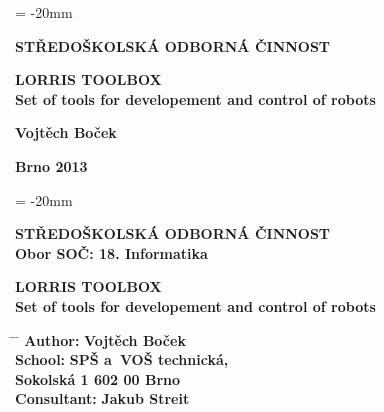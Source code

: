 \documentclass[12pt, a4paper, oneside]{article}
\newcommand{\B}{\textbf} %
\begin{document}

\pagestyle{empty} %
 
\voffset = -20mm %
\enlargethispage{60mm} %

\begin{center}
 
\Large \B{STŘEDOŠKOLSKÁ ODBORNÁ ČINNOST}

\vspace{60mm}

\huge %
\B{LORRIS TOOLBOX \\ Set of tools for developement and control of robots}

\Large

\vspace{90mm}


\B{Vojtěch Boček} \\

\vspace{40mm}

\B{Brno 2013}


\end{center}

\newpage %

\voffset = -20mm %
\enlargethispage{60mm} %

\begin{center}

\Large \B{STŘEDOŠKOLSKÁ ODBORNÁ ČINNOST}  \\
\vspace{10mm}
 \normalsize 
\B{Obor SOČ: 18. Informatika}%

\vspace{45mm}

\LARGE %
\B{LORRIS TOOLBOX \\ Set of tools for developement and control of robots} 
\end{center}  
\large

\vspace{50mm}


\begin{tabbing}
\hspace{10mm} \= \hspace{30mm}  \=   \kill %
  \> \B{Author:}  \> \B{Vojtěch Boček}        \\[8mm] 
  \> \B{School:}   \> \B{SPŠ a~VOŠ technická, }     \\
  \>              \> \B{Sokolská 1 602 00 Brno}    \\[8mm]

  \> \B{Consultant:} \> \B {Jakub Streit} 
\end{tabbing}
\end{document}
